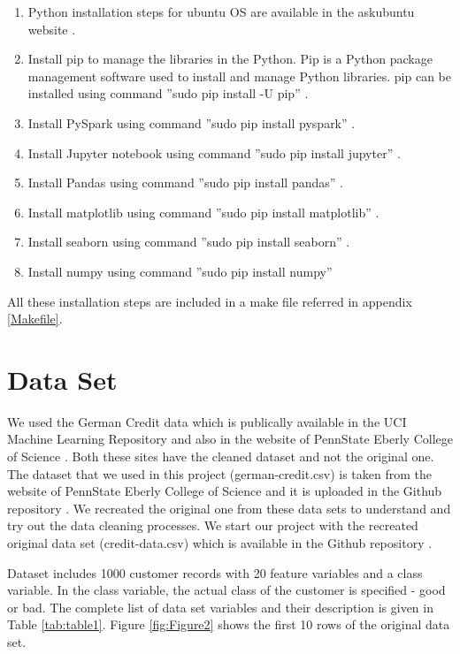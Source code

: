 \documentclass[sigconf]{acmart}
\begin{document}
\begin{enumerate}
  \item Python installation steps for ubuntu OS are available in the askubuntu website \cite{python-installations}.
  \item Install pip to manage the libraries in the Python. Pip is a Python package management software used to install and manage Python libraries. pip can be installed using command ''sudo pip install -U pip'' \cite{pip-package}.   
  \item Install PySpark using command ''sudo pip install pyspark'' \cite{pyspark-installation}.
  \item Install Jupyter notebook using command ''sudo pip install jupyter'' \cite{jupyter-installation}.
   \item Install Pandas using command ''sudo pip install pandas'' \cite{pandas-installation}.
   \item Install matplotlib using command ''sudo pip install matplotlib'' \cite{matplotlib-installation}.
   \item Install seaborn using command ''sudo pip install seaborn'' \cite{seaborn-installation}.
   \item Install numpy using command ''sudo pip install numpy'' \cite{numpy-installation}
\end{enumerate}

All these installation steps are included in a make file referred in appendix \ref{Makefile}.

\section{Data Set}

We used the German Credit data which is publically available in the UCI Machine Learning Repository \cite{uci} and also in the website of PennState Eberly College of Science \cite{psu-site}. Both these sites have the cleaned dataset and not the original one. The dataset that we used in this project (german-credit.csv) is taken from the website of PennState Eberly College of Science \cite{psu-site} and it is uploaded in the Github repository \cite{github}. We recreated the original one from these data sets to understand and try out the data cleaning processes. We start our project with the recreated original data set (credit-data.csv) which is available in the Github repository \cite{github}. 

Dataset includes 1000 customer records with 20 feature variables and a class variable. In the class variable, the actual class of the customer is specified - good or bad. The complete list of data set variables and their description is given in Table \ref{tab:table1}. Figure \ref{fig:Figure2} shows the first 10 rows of the original data set.
\end{document}
